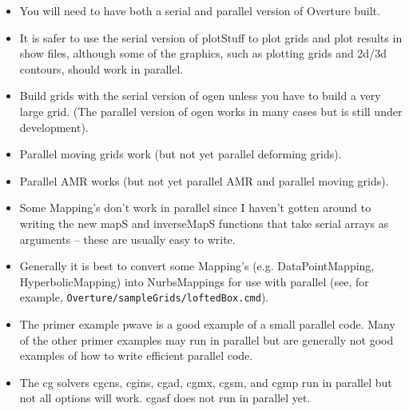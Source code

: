 \documentclass{article}
\begin{document}
\begin{itemize}
  \item You will need to have both a serial and parallel version of Overture built.
  \item It is safer to use the serial version of plotStuff to plot grids and plot results in show files, although
        some of the graphics, such as plotting grids and 2d/3d contours, should work in parallel.
  \item Build grids with the serial version of ogen unless you have to build a very large grid. (The parallel version of ogen
        works in many cases but is still under development).
  \item Parallel moving grids work (but not yet parallel deforming grids).
  \item Parallel AMR works (but not yet parallel AMR and parallel moving grids).
  \item Some Mapping's don't work in parallel since I haven't gotten around to writing the
     new mapS and inverseMapS functions that take serial arrays as arguments 
     -- these are usually easy to write. 
  \item Generally it is best to convert some Mapping's (e.g. DataPointMapping, HyperbolicMapping)
       into NurbsMappings for use with parallel (see, for example, {\tt Overture/sampleGrids/loftedBox.cmd}). 
\end{itemize}


\begin{itemize}
  \item The primer example pwave is a good example of a small parallel code. Many of the
        other primer examples may run in parallel but are generally not good examples of how to write efficient
        parallel code.
  \item The cg solvers cgcns, cgins, cgad, cgmx, cgsm, and cgmp run in parallel but not all options will work. 
        cgasf does not run in parallel yet. 
\end{itemize}
\end{document}
